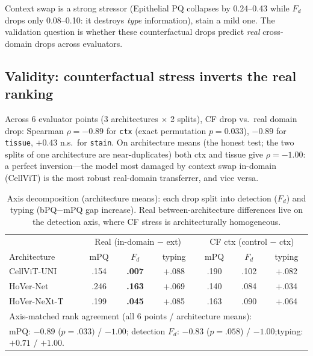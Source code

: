 \documentclass[11pt]{article}
\begin{document}
Context swap is a strong stressor (Epithelial PQ collapses by 0.24--0.43 while $F_d$ drops only
0.08--0.10: it destroys \emph{type} information), stain a mild one. The validation question is
whether these counterfactual drops predict \emph{real} cross-domain drops across evaluators.

\subsection{Validity: counterfactual stress inverts the real ranking}
\label{sec:validity}

Across 6 evaluator points (3 architectures $\times$ 2 splits), CF drop vs.\ real domain drop:
Spearman $\rho=-0.89$ for \texttt{ctx} (exact permutation $p=0.033$), $-0.89$ for
\texttt{tissue}, $+0.43$ n.s.\ for \texttt{stain}. On architecture means (the honest test; the
two splits of one architecture are near-duplicates) both ctx and tissue give $\rho=-1.00$: a
perfect inversion---the model most damaged by context swap in-domain (CellViT) is the most
robust real-domain transferrer, and vice versa.

\begin{table}[t]
\centering\small
\caption{Axis decomposition (architecture means): each drop split into detection ($F_d$) and
typing (bPQ$-$mPQ gap increase). Real between-architecture differences live on the detection
axis, where CF stress is architecturally homogeneous.}
\label{tab:axes}
\begin{tabular}{lcc|cc|cc}
\toprule
& \multicolumn{3}{c|}{Real (in-domain $-$ ext)} & \multicolumn{3}{c}{CF ctx (control $-$ ctx)} \\
Architecture & mPQ & $F_d$ & typing & mPQ & $F_d$ & typing \\
\midrule
CellViT-UNI  & .154 & \textbf{.007} & +.088 & .190 & .102 & +.082 \\
HoVer-Net    & .246 & \textbf{.163} & +.069 & .140 & .084 & +.034 \\
HoVer-NeXt-T & .199 & \textbf{.045} & +.085 & .163 & .090 & +.064 \\
\midrule
\multicolumn{7}{l}{\footnotesize Axis-matched rank agreement (all 6 points / architecture means):}\\
\multicolumn{7}{l}{\footnotesize\quad mPQ: $-0.89$ ($p{=}.033)$ / $-1.00$;\quad
detection $F_d$: $-0.83$ ($p{=}.058$) / $-1.00$;\quad typing: $+0.71$ / $\mathbf{+1.00}$.}\\
\bottomrule
\end{tabular}
\end{table}
\end{document}
